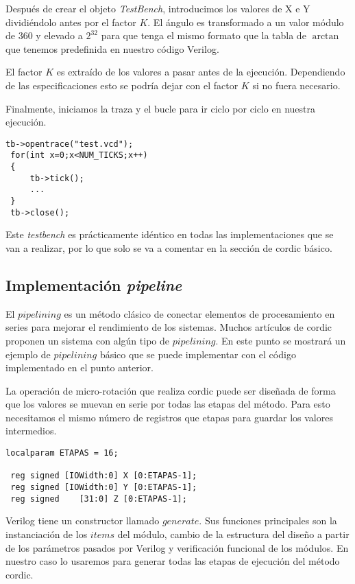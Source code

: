 Después de crear el objeto \textit{TestBench}, introducimos los valores de X e Y  dividiéndolo antes por el factor $K$. El ángulo es transformado a un valor módulo de 360 y elevado a $2^{32}$ para que tenga el mismo formato que la tabla de $\arctan$ que tenemos predefinida en nuestro código Verilog.

El factor $K$ es extraído de los valores a pasar antes de la ejecución. Dependiendo de las especificaciones esto se podría dejar con el factor $K$ si no fuera necesario.

Finalmente, iniciamos la traza y el bucle para ir ciclo por ciclo en nuestra ejecución.

\begin{lstlisting}[caption={Bucle principal de main.cpp}]
 tb->opentrace("test.vcd");
 for(int x=0;x<NUM_TICKS;x++)
 {
     tb->tick();
     ...
 }
 tb->close();
\end{lstlisting}

Este \textit{testbench} es prácticamente idéntico en todas las implementaciones que se van a realizar, por lo que solo se va a comentar en la sección de \gls{cordic} básico.

\subsection{Implementación \textit{pipeline}}
El $pipelining$ es un método clásico de conectar elementos de procesamiento en series para  mejorar el rendimiento de los sistemas. Muchos artículos de \gls{cordic} proponen un sistema con algún tipo de $pipelining$. En este punto se mostrará un ejemplo de $pipelining$ básico que se puede implementar con el código implementado en el punto anterior.

La operación de micro-rotación que realiza \gls{cordic} puede ser diseñada de forma que los valores se muevan en serie por todas las etapas del método. Para esto necesitamos el mismo número de registros que etapas para guardar los valores intermedios.

\begin{lstlisting}[caption={Registros de \gls{cordic} ampliados para \textit{pipelining}}]
localparam ETAPAS = 16;

 reg signed [IOWidth:0] X [0:ETAPAS-1];
 reg signed [IOWidth:0] Y [0:ETAPAS-1];
 reg signed    [31:0] Z [0:ETAPAS-1];

\end{lstlisting}

Verilog tiene un constructor llamado $generate$. Sus funciones principales son la instanciación de los $items$ del módulo, cambio de la estructura del diseño a partir de los parámetros pasados por Verilog y verificación funcional de los módulos. En nuestro caso lo usaremos para generar todas las etapas de ejecución del método \gls{cordic}.

